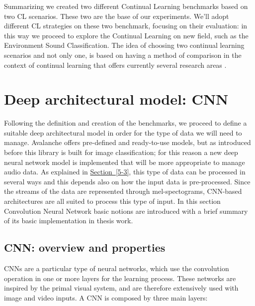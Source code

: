 \documentclass[english, LaM, oneside]{sapthesis}%
\begin{document}

\vspace{5mm}
Summarizing we created two different Continual Learning benchmarks based on two CL scenarios. These two are the base of our experiments. We'll adopt different CL strategies on these two benchmark, focusing on their evaluation: in this way we proceed to explore the Continual Learning on new field, such as the Environment Sound Classification. The idea of choosing two continual learning scenarios and not only one, is based on having a method of comparison in the context of continual learning that offers currently several research areas .


\section{Deep architectural model: CNN}
Following the definition and creation of the benchmarks, we proceed to define a suitable deep architectural model in order for the type of data we will need to manage. Avalanche offers pre-defined and ready-to-use models, but as introduced before this library is built for image classification; for this reason a new deep neural network model is implemented that will be more appropriate to manage audio data. As explained in \hyperref[5-3]{Section~\ref*{5-3}}, this type of data can be processed in several ways and this depends also on how the input data is pre-processed. Since the streams of the data are represented through mel-spectograms, CNN-based architectures are all suited to process this type of input.
\newline \newline
In this section Convolution Neural Network basic notions are introduced with a brief summary of its basic implementation in thesis work.

\subsection{CNN: overview and properties}
CNNs are a particular type of neural networks, which use the convolution operation in one or more layers for the learning process. These networks are inspired by the primal visual system, and are therefore extensively used with image and video inputs. A CNN is composed by three main layers:
\end{document}
